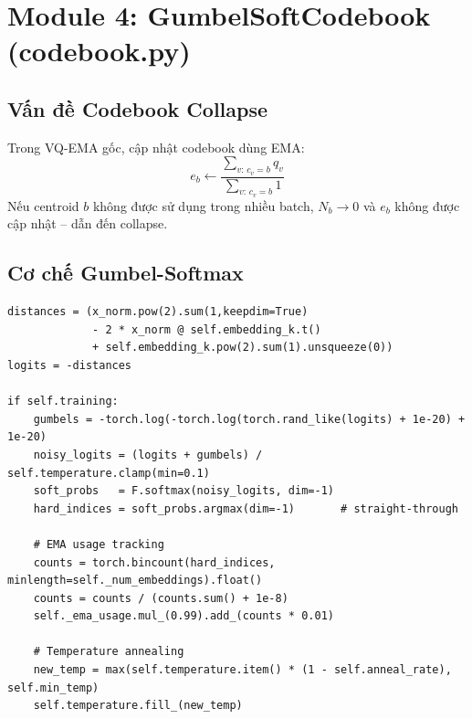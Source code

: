 \documentclass[12pt,a4paper]{article}
\begin{document}
\section{Module 4: GumbelSoftCodebook (codebook.py)}

\subsection{Vấn đề Codebook Collapse}

Trong VQ-EMA gốc, cập nhật codebook dùng EMA:
\begin{equation}
  e_b \leftarrow \frac{\sum_{v:\,c_v=b} q_v}{\sum_{v:\,c_v=b} 1}
\end{equation}
Nếu centroid $b$ không được sử dụng trong nhiều batch, $N_b \to 0$ và
$e_b$ không được cập nhật -- dẫn đến collapse.

\subsection{Cơ chế Gumbel-Softmax}

\begin{codebox}[title={codebook.py -- GumbelSoftCodebook.update()}]
\begin{lstlisting}
distances = (x_norm.pow(2).sum(1,keepdim=True)
             - 2 * x_norm @ self.embedding_k.t()
             + self.embedding_k.pow(2).sum(1).unsqueeze(0))
logits = -distances

if self.training:
    gumbels = -torch.log(-torch.log(torch.rand_like(logits) + 1e-20) + 1e-20)
    noisy_logits = (logits + gumbels) / self.temperature.clamp(min=0.1)
    soft_probs   = F.softmax(noisy_logits, dim=-1)
    hard_indices = soft_probs.argmax(dim=-1)       # straight-through
    
    # EMA usage tracking
    counts = torch.bincount(hard_indices, minlength=self._num_embeddings).float()
    counts = counts / (counts.sum() + 1e-8)
    self._ema_usage.mul_(0.99).add_(counts * 0.01)
    
    # Temperature annealing
    new_temp = max(self.temperature.item() * (1 - self.anneal_rate), self.min_temp)
    self.temperature.fill_(new_temp)
\end{lstlisting}
\end{codebox}
\end{document}
